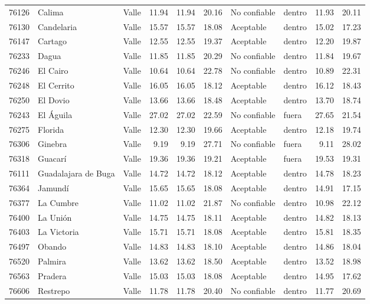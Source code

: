 {\begin{longtable}{l p{3.0cm} l r r r l l r r}
76126 & Calima & Valle & 11.94 & 11.94 & 20.16 & No confiable & dentro & 11.93 & 20.11 \\
76130 & Candelaria & Valle & 15.57 & 15.57 & 18.08 & Aceptable & dentro & 15.02 & 17.23 \\
76147 & Cartago & Valle & 12.55 & 12.55 & 19.37 & Aceptable & dentro & 12.20 & 19.87 \\
76233 & Dagua & Valle & 11.85 & 11.85 & 20.29 & No confiable & dentro & 11.84 & 19.67 \\
76246 & El Cairo & Valle & 10.64 & 10.64 & 22.78 & No confiable & dentro & 10.89 & 22.31 \\
76248 & El Cerrito & Valle & 16.05 & 16.05 & 18.12 & Aceptable & dentro & 16.12 & 18.43 \\
76250 & El Dovio & Valle & 13.66 & 13.66 & 18.48 & Aceptable & dentro & 13.70 & 18.74 \\
76243 & El Águila & Valle & 27.02 & 27.02 & 22.59 & No confiable & fuera & 27.65 & 21.54 \\
76275 & Florida & Valle & 12.30 & 12.30 & 19.66 & Aceptable & dentro & 12.18 & 19.74 \\
76306 & Ginebra & Valle & 9.19 & 9.19 & 27.71 & No confiable & fuera & 9.11 & 28.02 \\
76318 & Guacarí & Valle & 19.36 & 19.36 & 19.21 & Aceptable & fuera & 19.53 & 19.31 \\
76111 & Guadalajara de Buga & Valle & 14.72 & 14.72 & 18.12 & Aceptable & dentro & 14.78 & 18.23 \\
76364 & Jamundí & Valle & 15.65 & 15.65 & 18.08 & Aceptable & dentro & 14.91 & 17.15 \\
76377 & La Cumbre & Valle & 11.02 & 11.02 & 21.87 & No confiable & dentro & 10.98 & 22.12 \\
76400 & La Unión & Valle & 14.75 & 14.75 & 18.11 & Aceptable & dentro & 14.82 & 18.13 \\
76403 & La Victoria & Valle & 15.71 & 15.71 & 18.08 & Aceptable & dentro & 15.81 & 18.35 \\
76497 & Obando & Valle & 14.83 & 14.83 & 18.10 & Aceptable & dentro & 14.86 & 18.04 \\
76520 & Palmira & Valle & 13.62 & 13.62 & 18.50 & Aceptable & dentro & 13.52 & 18.98 \\
76563 & Pradera & Valle & 15.03 & 15.03 & 18.08 & Aceptable & dentro & 14.95 & 17.62 \\
76606 & Restrepo & Valle & 11.78 & 11.78 & 20.40 & No confiable & dentro & 11.77 & 20.69 \\

\end{longtable}}
